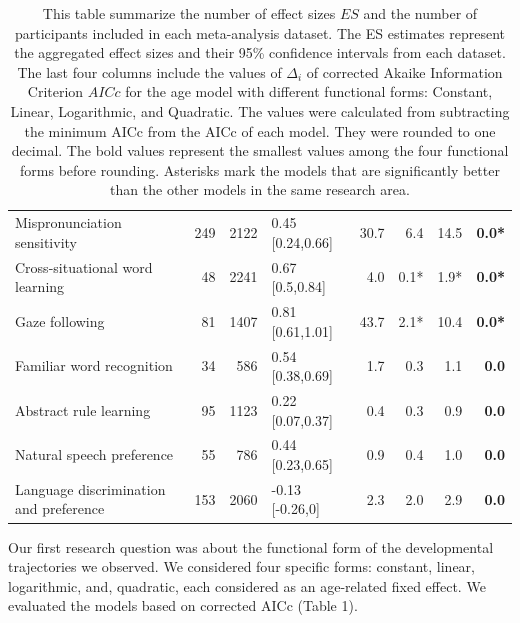 \documentclass[10pt, letterpaper]{article}
\begin{document}
\begin{table}[ht]
\begin{tabular}{l|r|r|l|r|r|r|r}
Mispronunciation sensitivity & 249 & 2122 & 0.45 [0.24,0.66] & 30.7 & 6.4 & 14.5 & \textbf{0.0*}\\
Cross-situational word learning & 48 & 2241 & 0.67 [0.5,0.84] & 4.0 & 0.1* & 1.9* & \textbf{0.0*}\\
Gaze following  & 81 & 1407 & 0.81 [0.61,1.01] & 43.7 & 2.1* & 10.4 & \textbf{0.0*}\\
Familiar word recognition & 34 & 586 & 0.54 [0.38,0.69] & 1.7 & 0.3 & 1.1 & \textbf{0.0}\\
Abstract rule learning & 95 & 1123 & 0.22 [0.07,0.37] & 0.4 & 0.3 & 0.9 & \textbf{0.0}\\
Natural speech preference & 55 & 786 & 0.44 [0.23,0.65] & 0.9 & 0.4 & 1.0 & \textbf{0.0}\\
Language discrimination and preference & 153 & 2060 & -0.13 [-0.26,0] & 2.3 & 2.0 & 2.9 & \textbf{0.0}\\


\hline
\end{tabular}
\caption{\label{demo-table}This table summarize the number of effect sizes \(ES\) and the number of participants included in each meta-analysis dataset. The ES estimates represent the aggregated effect sizes and their 95\% confidence intervals from each dataset. The last four columns include the values of $\Delta_{i}$ of corrected Akaike Information Criterion \(AICc\) for the age model with different functional forms: Constant, Linear, Logarithmic, and Quadratic. The values were calculated from subtracting the minimum AICc from the AICc of each model. They were rounded to one decimal. The bold values represent the smallest values among the four functional forms before rounding. Asterisks mark the models that are significantly better than the other models in the same research area.}
\end{table}

Our first research question was about the functional form of the
developmental trajectories we observed. We considered four specific
forms: constant, linear, logarithmic, and, quadratic, each considered as
an age-related fixed effect. We evaluated the models based on corrected
AICc (Table 1).
\end{document}
